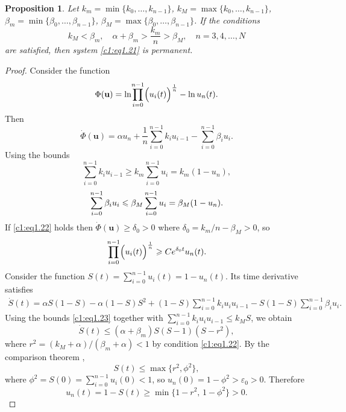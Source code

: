 \documentclass[12pt]{report}
\newtheorem{proposition}[theorem]{Proposition}
\theoremstyle{definition}
\theoremstyle{remark}
\begin{document}
\begin{proposition}
Let $k_{m}=\min\{k_{0},\ldots,k_{n-1}\}$,
$k_{M}=\max\{k_{0},\ldots,k_{n-1}\}$,
$\beta_{m}=\min\{\beta_{0},\ldots,\beta_{n-1}\}$,
$\beta_{M}=\max\{\beta_{0},\ldots,\beta_{n-1}\}$.
If the conditions
\begin{equation}
  k_{M}<\beta_{m},\quad
  \alpha+\beta_{m}>\frac{k_{m}}{n}>\beta_{M},\quad
  n=3,4,\ldots,N
  \label{c1:eq1.22}
\end{equation}
are satisfied, then system \eqref{c1:eq1.21} is permanent.
\end{proposition}

\begin{proof}
Consider the function
\[
  \Phi(\mathbf{u})
  =\ln\!\prod_{i=0}^{n-1}\Bigl(u_{i}(t)\Bigr)^{\frac{1}{n}}-\ln u_{n}(t).
\]
Then
\[
  \dot{\Phi}(\mathbf{u})
  =\alpha u_{n}+\frac{1}{n}\sum_{i=0}^{n-1}k_{i}u_{i-1}
   -\sum_{i=0}^{n-1}\beta_{i}u_{i}.
\]
Using the bounds
\begin{equation}\label{c1:eq1.23}
	\sum\limits_{i = 0}^{n - 1}k_{i}u_{i - 1} \geqslant k_{m}\sum\limits_{i = 0}^{n - 1}u_{i} = k_{m}(1 - u_{n}),
\end{equation}
\begin{equation*}
	\sum\limits_{i = 0}^{n - 1}\beta_{i}u_{i} \leqslant \beta_{M}\sum\limits_{i = 0}^{n - 1}u_{i} = \beta_{M}(1 - u_{n}). \\
\end{equation*}
If \eqref{c1:eq1.22} holds then
$\dot{\Phi}(\mathbf{u})\geqslant\delta_{0}>0$
where $\delta_{0}=k_{m}/n-\beta_{M}>0$, so
\begin{equation}
  \prod_{i=0}^{n-1}\Bigl(u_{i}(t)\Bigr)^{\frac{1}{n}}
  \geqslant Ce^{\delta_{0}t}u_{n}(t).
  \label{c1:eq1.24}
\end{equation}
Consider the function $S(t)=\sum_{i=0}^{n-1}u_{i}(t)=1-u_{n}(t)$.
Its time derivative satisfies
\begin{multline*}
	\dot{S}(t) = \alpha S(1-S) - \alpha(1-S)S^{2}
	+ (1-S)\sum_{i=0}^{n-1}k_{i}u_{i}u_{i-1}
	- S(1-S)\sum_{i=0}^{n-1}\beta_{i}u_{i}.
\end{multline*}
Using the bounds \eqref{c1:eq1.23} together with
$\sum_{i=0}^{n-1}k_{i}u_{i}u_{i-1}\leqslant k_{M}S$, we obtain
\[
\dot{S}(t)\leqslant(\alpha+\beta_{m})S(S-1)(S-r^{2}),
\]
where $r^{2}=(k_{M}+\alpha)/(\beta_{m}+\alpha)<1$ by condition
\eqref{c1:eq1.22}. By the comparison theorem \cite{c1:Tihonov1985},
\[
S(t)\leqslant\max\{r^{2},\phi^{2}\},
\]
where $\phi^{2}=S(0)=\sum_{i=0}^{n-1}u_{i}(0)<1$, so
$u_{n}(0)=1-\phi^{2}>\varepsilon_{0}>0$.
Therefore
\[
u_{n}(t)=1-S(t)\geqslant\min\{1-r^{2},\,1-\phi^{2}\}>0.
\]

\end{proof}
\end{document}
